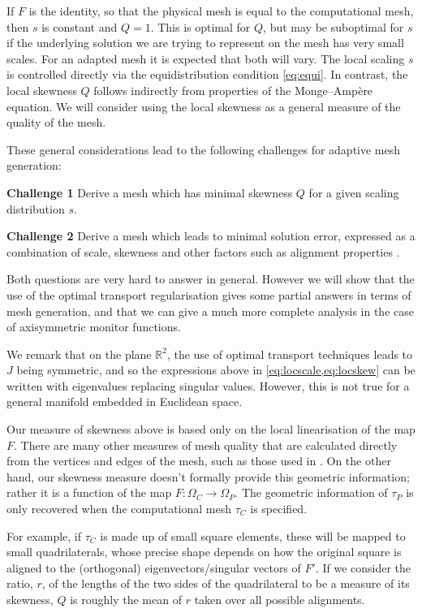 \documentclass[11pt, a4paper]{scrartcl}  %
\theoremstyle{plain}
\theoremstyle{definition}
\numberwithin{equation}{section}
\begin{document}
If $F$ is the identity, so that the physical mesh is equal to the
computational mesh, then $s$ is constant and $Q = 1$. This is optimal
for $Q$, but may be suboptimal for $s$ if the underlying solution we are
trying to represent on the mesh has very small scales. For an adapted
mesh it is expected that both will vary. The local scaling $s$ is
controlled directly via the equidistribution condition \cref{eq:equi}.
In contrast, the local skewness $Q$ follows indirectly from properties
of the Monge--Ampère equation. We will consider using the local skewness
as a general measure of the quality of the mesh.

These general considerations lead to the following challenges for
adaptive mesh generation:

\textbf{Challenge 1} Derive a mesh which has minimal skewness $Q$ for a
given scaling distribution $s$.

\textbf{Challenge 2} Derive a mesh which leads to minimal solution
error, expressed as a combination of scale, skewness and other factors
such as alignment properties \citep{huang2011adaptive}.

Both questions are very hard to answer in general. However we will show
that the use of the optimal transport regularisation gives some partial
answers in terms of mesh generation, and that we can give a much more
complete analysis in the case of axisymmetric monitor functions.

We remark that on the plane $\mathbb{R}^2$, the use of optimal transport
techniques leads to $J$ being symmetric, and so the expressions above in
\cref{eq:locscale,eq:locskew} can be written with eigenvalues replacing
singular values. However, this is not true for a general manifold
embedded in Euclidean space.

Our measure of skewness above is based only on the local linearisation
of the map $F$. There are many other measures of mesh quality that are
calculated directly from the vertices and edges of the mesh, such as
those used in \citet{weller2016mesh}. On the other hand, our skewness
measure doesn't formally provide this geometric information; rather it
is a function of the map $F: \Omega_C \to \Omega_P$. The geometric
information of $\tau_P$ is only recovered when the computational mesh
$\tau_C$ is specified.

For example, if $\tau_C$ is made up of small square elements, these will
be mapped to small quadrilaterals, whose precise shape depends on how
the original square is aligned to the (orthogonal) eigenvectors/singular
vectors of $F'$. If we consider the ratio, $r$, of the lengths of the
two sides of the quadrilateral to be a measure of its skewness, $Q$ is
roughly the mean of $r$ taken over all possible alignments.
\end{document}
